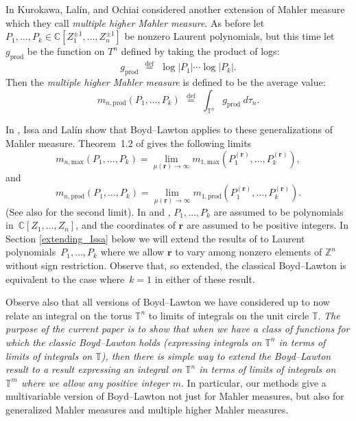 \documentclass[12pt]{amsart}
\theoremstyle{plain}
\theoremstyle{definition}
\theoremstyle{remark}
\numberwithin{theorem}{section}
\numberwithin{equation}{section} %
\newcommand{\defeq}{\stackrel{\mathrm{def}}{\, = \,}}
\newcommand{\bZ}{{\mathbb{Z}}}
\newcommand{\bC}{{\mathbb{C}}}
\newcommand{\mb}{\mathbf}
\newcommand{\torus}{{\mathbb{T}}}
\begin{document}
In \cite{Kurokawa2008} Kurokawa, Lal\'in, and Ochiai considered another extension 
of Mahler measure
which they call \emph{multiple higher Mahler measure}. 
As before let $P_1, \ldots, P_k \in  \bC\left[Z^{\pm 1}_1, \ldots, Z^{\pm 1}_n\right]$ be nonzero Laurent polynomials, 
but this time let
 $g_{\mathrm{prod}}$ be the function on $T^n$ defined by taking the product of logs:
$$
g_{\mathrm{prod}} \;  \defeq  \;  \log|P_1| \cdots \log|P_k|.
$$
Then the \emph{multiple higher Mahler measure} is defined to be
the average value:
$$
m_{n, \mathrm{prod}} (P_1, \ldots, P_k) \; \defeq \; \int_{\torus^n} g_\mathrm{prod} \ d\tau_n.
$$

In \cite{Issa2013}, Issa and Lal\'in show that Boyd--Lawton 
applies to these generalizations of Mahler measure.
Theorem~1.2 of \cite{Issa2013} gives the following limits
$$
m_{n, \textrm{max}} (P_1, \ldots, P_k) = 
\lim_{\mu\left({\mb r}\right) \to\infty} m_{1, \textrm{max}} \left(P_1^{(\mb r)}, \ldots, P_k^{(\mb r)}\right),
$$
and
$$
m_{n, \textrm{prod}} (P_1, \ldots, P_k) = 
\lim_{\mu\left({\mb r}\right) \to\infty} m_{1, \textrm{prod}}\left(P_1^{(\mb r)}, \ldots, P_k^{(\mb r)}\right).
$$
(See also \cite[Theorem 30] {LalinSinha} for the second limit).
In \cite{Issa2013} and \cite{LalinSinha}, $P_1, \ldots, P_k$ are assumed to be polynomials in~$\bC[Z_1, \ldots, Z_n]$, and the coordinates of $\mb r$
are assumed to be positive integers. In Section \ref{extending_Issa} below we will extend the results of \cite{Issa2013} to Laurent polynomials~$P_1, \ldots, P_k$ 
where we allow $\mb r$ to vary among nonzero elements of $\bZ^n$ without sign restriction.
Observe that, so extended, the classical Boyd--Lawton is equivalent to the case where~$k=1$ in either of
these result.


Observe also that all versions of Boyd--Lawton we have considered up to now relate an integral on 
the torus $\torus^n$ to  limits of integrals on the unit circle $\torus$.
\emph{The purpose of the current paper is to show that when we have a class of functions
for which the classic Boyd--Lawton holds (expressing integrals on $\torus^n$ in terms of limits of integrals
on $\torus$), then there is simple way to extend the Boyd--Lawton result to a result
expressing an integral on $\torus^n$ in terms of limits of integrals on $\torus^m$ where 
we allow any positive integer $m$}.
In particular, our methods give a multivariable version of Boyd--Lawton not just for Mahler measures, but also for generalized
Mahler measures and multiple higher Mahler measures.
\end{document}
